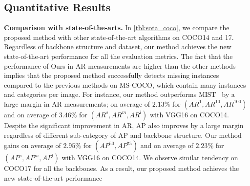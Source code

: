 \documentclass[runningheads]{llncs}
\begin{document}
\subsection{Quantitative Results}\noindent\textbf{Comparison with state-of-the-arts.}
In \cref{tbl:sota_coco}, we compare the proposed
method with other state-of-the-art algorithms on COCO14 and 17.
Regardless of backbone structure and dataset, our method achieves the new state-of-the-art performance for all the evaluation metrics.
The fact that the performance of Ours in AR measurements are higher than the other methods implies that the proposed method successfully detects missing instances compared to the previous methods on MS-COCO, which contain many instances
and categories per image.
For instance, our method outperforms MIST~\cite{ren2020instance} by a large margin in AR measurements; on average of $2.13\%$ for $(AR^1, AR^{10}, AR^{100})$ 
and on average of $3.46\%$ for $(AR^s, AR^m, AR^l)$ with VGG16 on COCO14.
Despite the significant improvement in AR, AP also improves by a large margin regardless of different sub-category of AP and backbone structure.
Our method gains on average of $2.95\%$ for $(AP^{50}, AP^{75})$ and on average of $2.23\%$ for $(AP^s, AP^m, AP^l)$ with VGG16 on COCO14.
We observe similar tendency on COCO17 for all the backbones.
As a result, our proposed method achieves the new state-of-the-art performance
\end{document}
